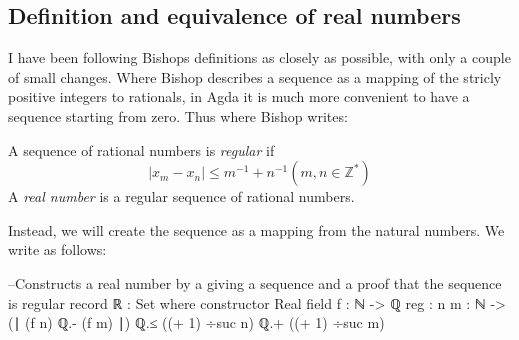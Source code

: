 \documentclass[11pt,a4paper]{article}
\begin{document}
\subsection{Definition and equivalence of real numbers}
I have been following Bishops definitions as closely as possible, with only a couple of small changes. Where Bishop describes a sequence as a mapping of the stricly positive integers to rationals, in Agda it is much more convenient to have a sequence starting from zero. Thus where Bishop writes:
\begin{blockquote}
A sequence of rational numbers is \textit{regular} if 
$$| x_m - x_n | \leq m^{-1} + n^{-1} (m, n \in \mathbb{Z}^*)$$
A \textit{real number} is a regular sequence of rational numbers.
\end{blockquote}

Instead, we will create the sequence as a mapping from the natural numbers. We write as follows:
\begin{code}
--Constructs a real number by a giving a sequence and a proof that the sequence is regular
record ℝ : Set where
  constructor Real
  field
    f : ℕ -> ℚ
    reg : {n m : ℕ} -> (∣ (f n) ℚ.- (f m) ∣) ℚ.≤ ((+ 1) ÷suc n) ℚ.+ ((+ 1) ÷suc m)

\end{code}



\end{document}
